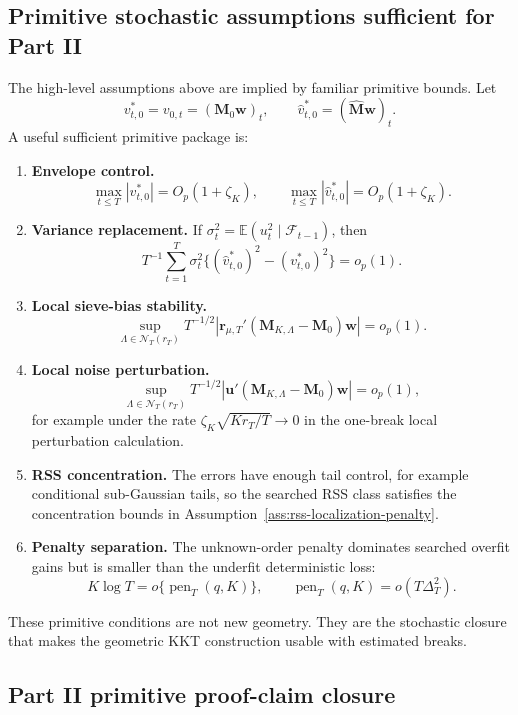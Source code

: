 \documentclass[12pt]{article}
\numberwithin{equation}{section}
\theoremstyle{definition}
\newcommand{\E}{\mathbb E}
\newcommand{\op}{o_p}
\newcommand{\Op}{O_p}
\begin{document}
\subsection{Primitive stochastic assumptions sufficient for Part II}

The high-level assumptions above are implied by familiar primitive bounds. Let
\[
    v^*_{t,0}=v_{0,t}=(\bm M_0\bm w)_t,
    \qquad
    \widehat v^*_{t,0}=(\widehat{\bm M}\bm w)_t.
\]
A useful sufficient primitive package is:
\begin{enumerate}[leftmargin=2em]
\item \textbf{Envelope control.}
      \[
          \max_{t\le T}|v^*_{t,0}|=\Op(1+\zeta_K),
          \qquad
          \max_{t\le T}|\widehat v^*_{t,0}|=\Op(1+\zeta_K).
      \]
\item \textbf{Variance replacement.} If
      \(\sigma_t^2=\E(u_t^2\mid\mathcal F_{t-1})\), then
      \[
          T^{-1}\sum_{t=1}^T
          \sigma_t^2\{(\widehat v^*_{t,0})^2-(v^*_{t,0})^2\}=\op(1).
      \]
\item \textbf{Local sieve-bias stability.}
      \[
          \sup_{\Lambda\in\mathcal N_T(r_T)}
          T^{-1/2}|\bm r_{\mu,T}'(\bm M_{K,\Lambda}-\bm M_0)\bm w|=\op(1).
      \]
\item \textbf{Local noise perturbation.}
      \[
          \sup_{\Lambda\in\mathcal N_T(r_T)}
          T^{-1/2}|\bm u'(\bm M_{K,\Lambda}-\bm M_0)\bm w|=\op(1),
      \]
      for example under the rate \(\zeta_K\sqrt{Kr_T/T}\to0\) in the one-break
      local perturbation calculation.
\item \textbf{RSS concentration.} The errors have enough tail control, for
      example conditional sub-Gaussian tails, so the searched RSS class satisfies
      the concentration bounds in Assumption~\ref{ass:rss-localization-penalty}.
\item \textbf{Penalty separation.} The unknown-order penalty dominates searched
      overfit gains but is smaller than the underfit deterministic loss:
      \[
          K\log T=o\{\operatorname{pen}_T(q,K)\},
          \qquad
          \operatorname{pen}_T(q,K)=o(T\Delta_T^2).
      \]
\end{enumerate}
These primitive conditions are not new geometry. They are the stochastic closure
that makes the geometric KKT construction usable with estimated breaks.
\subsection{Part II primitive proof-claim closure}
\end{document}
